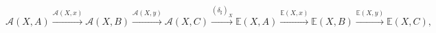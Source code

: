 \documentclass[preview]{standalone}
\begin{document}
\begin{center}
$$\mathscr{A}(X,A) \xrightarrow{\mathscr{A}(X,x)} \mathscr{A}(X,B) \xrightarrow{\mathscr{A}(X,y)} \mathscr{A}(X,C) \xrightarrow{(\delta_\sharp)_X} \mathbb{E}(X,A) \xrightarrow{\mathbb{E}(X,x)} \mathbb{E}(X,B) \xrightarrow{\mathbb{E}(X,y)} \mathbb{E}(X,C),$$
\end{center}
\end{document}
